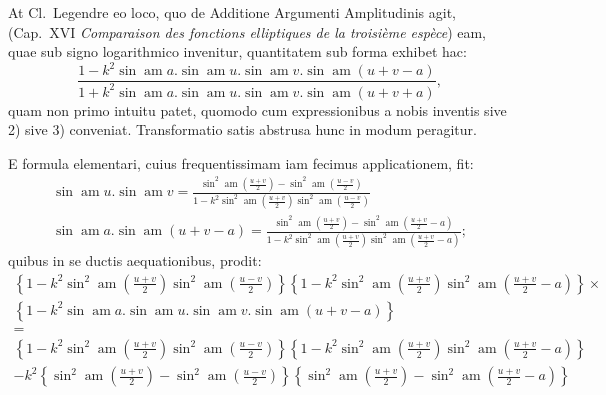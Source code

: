 \documentclass{article}
\begin{document}
At Cl.\ Legendre eo loco, quo de Additione Argumenti Amplitudinis agit, (Cap.\ XVI \emph{Comparaison des fonctions elliptiques de la troisième espèce}) eam, quae sub signo logarithmico invenitur, quantitatem sub forma exhibet hac:
\[
\frac{1-k^{2}\sin\operatorname{am}a.\sin\operatorname{am}u.\sin\operatorname{am}v.\sin\operatorname{am}(u+v-a)}{1+k^{2}\sin\operatorname{am}a.\sin\operatorname{am}u.\sin\operatorname{am}v.\sin\operatorname{am}(u+v+a)},
\]
quam non primo intuitu patet, quomodo cum expressionibus a nobis inventis sive 2) sive 3) conveniat. Transformatio satis abstrusa hunc in modum peragitur.

E formula elementari, cuius frequentissimam iam fecimus applicationem, fit:
\[
\begin{gathered}
\sin\operatorname{am}u.\sin\operatorname{am}v=\frac{\sin^{2}\operatorname{am}\left(\frac{u+v}{2}\right)-\sin^{2}\operatorname{am}\left(\frac{u-v}{2}\right)}{1-k^{2}\sin^{2}\operatorname{am}\left(\frac{u+v}{2}\right)\sin^{2}\operatorname{am}\left(\frac{u-v}{2}\right)}\\[1.5ex]
\sin\operatorname{am}a.\sin\operatorname{am}(u+v-a)=\frac{\sin^{2}\operatorname{am}\left(\frac{u+v}{2}\right)-\sin^{2}\operatorname{am}\left(\frac{u+v}{2}-a\right)}{1-k^{2}\sin^{2}\operatorname{am}\left(\frac{u+v}{2}\right)\sin^{2}\operatorname{am}\left(\frac{u+v}{2}-a\right)};
\end{gathered}
\]
quibus in se ductis aequationibus, prodit:
\[
\begin{gathered}
\left\{1-k^{2}\sin^{2}\operatorname{am}\left(\frac{u+v}{2}\right)\sin^{2}\operatorname{am}\left(\frac{u-v}{2}\right)\right\}\left\{1-k^{2}\sin^{2}\operatorname{am}\left(\frac{u+v}{2}\right)\sin^{2}\operatorname{am}\left(\frac{u+v}{2}-a\right)\right\}\times\\[1.5ex]
\left\{1-k^{2}\sin\operatorname{am}a.\sin\operatorname{am}u.\sin\operatorname{am}v.\sin\operatorname{am}(u+v-a)\right\}\\[1.5ex]
=\\[1.5ex]
\left\{1-k^{2}\sin^{2}\operatorname{am}\left(\frac{u+v}{2}\right)\sin^{2}\operatorname{am}\left(\frac{u-v}{2}\right)\right\}\left\{1-k^{2}\sin^{2}\operatorname{am}\left(\frac{u+v}{2}\right)\sin^{2}\operatorname{am}\left(\frac{u+v}{2}-a\right)\right\}\\[1.5ex]
-k^{2}\left\{\sin^{2}\operatorname{am}\left(\frac{u+v}{2}\right)-\sin^{2}\operatorname{am}\left(\frac{u-v}{2}\right)\right\}\left\{\sin^{2}\operatorname{am}\left(\frac{u+v}{2}\right)-\sin^{2}\operatorname{am}\left(\frac{u+v}{2}-a\right)\right\}
\end{gathered}
\]
\end{document}
